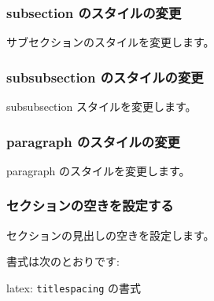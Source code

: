 \documentclass[dvipdfmx,a4j,14pt,uplatex]{jsarticle}
\begin{document}
\subsubsection{subsection のスタイルの変更}
\label{sec:orge83ff0a}
サブセクションのスタイルを変更します。


\subsubsection{subsubsection のスタイルの変更}
\label{sec:org11a4628}
subsubsection スタイルを変更します。

\subsubsection{paragraph のスタイルの変更}
\label{sec:org5e8c6fa}
paragraph のスタイルを変更します。




\subsubsection{セクションの空きを設定する}
\label{sec:org04de5d3}
セクションの見出しの空きを設定します。

書式は次のとおりです:

\begin{programlist}[label={org8a2890c}]{latex}{: \texttt{titlespacing} の書式}
\end{programlist}
\end{document}
